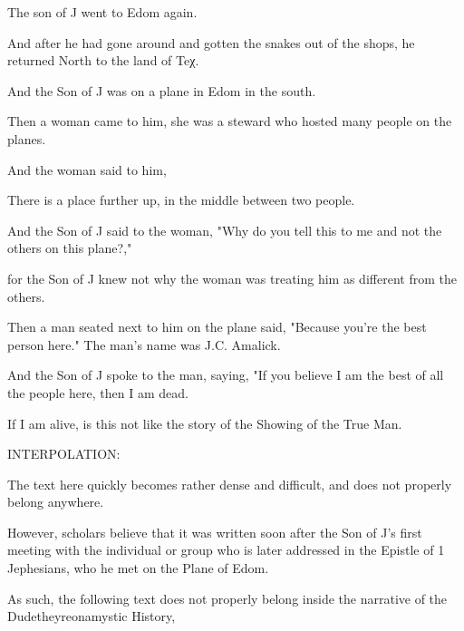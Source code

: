 
\Sentence
{ \hX{} }
{ \eX{} }
{
The son of J went to Edom again.
}

\Sentence
{ \hX{} }
{ \eX{} }
{
And after he had gone around and gotten the snakes out of the shops, he returned North to the land of Teχ.
}

\Sentence
{ \hX{} }
{ \eX{} }
{
And the Son of J was on a plane in Edom in the south.
}

\Sentence
{ \hX{} }
{ \eX{} }
{
Then a woman came to him, she was a steward who hosted many people on the planes.
}

\Sentence
{ \hX{} }
{ \eX{} }
{
And the woman said to him,
}

\Sentence
{ \hX{} }
{ \eX{} }
{
There is a place further up, in the middle between two people.
}

\Sentence
{ \hX{} }
{ \eX{} }
{
And the Son of J said to the woman, "Why do you tell this to me and not the others on this plane?,"
}

\Sentence
{ \hX{} }
{ \eX{} }
{
for the Son of J knew not why the woman was treating him as different from the others.
}

\Sentence
{ \hX{} }
{ \eX{} }
{
Then a man seated next to him on the plane said, "Because you're the best person here." The man's name was J.C. Amalick.
}

\Sentence
{ \hX{} }
{ \eX{} }
{
And the Son of J spoke to the man, saying, "If you believe I am the best of all the people here, then I am dead.
}

\Sentence
{ \hX{} }
{ \eX{} }
{
If I am alive, is this not like the story of the Showing of the True Man.
}

\Sentence
{ \hX{} }
{ \eX{} }
{
INTERPOLATION:
}

\Sentence
{ \hX{} }
{ \eX{} }
{
The text here quickly becomes rather dense and difficult, and does not properly belong anywhere.
}

\Sentence
{ \hX{} }
{ \eX{} }
{
However, scholars believe that it was written soon after the Son of J's first meeting with the individual or group who is later addressed in the Epistle of 1 Jephesians, who he met on the Plane of Edom.
}

\Sentence
{ \hX{} }
{ \eX{} }
{
As such, the following text does not properly belong inside the narrative of the Dudetheyreonamystic History,
}

